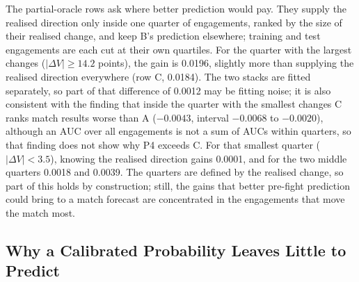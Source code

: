 The partial-oracle rows ask where better prediction would pay. They supply the realised direction only
inside one quarter of engagements, ranked by the size of their realised change, and keep B's prediction
elsewhere; training and test engagements are each cut at their own quartiles. For the quarter with the
largest changes ($|\Delta V| \geq 14.2$ points), the gain is 0.0196, slightly more than supplying the
realised direction everywhere (row C, 0.0184). The two stacks are fitted separately, so part of that
difference of 0.0012 may be fitting noise; it is also consistent with the finding that inside the quarter
with the smallest changes C ranks match results worse than A ($-0.0043$, interval $-0.0068$ to
$-0.0020$), although an AUC over all engagements is not a sum of AUCs within quarters, so that finding
does not show why P4 exceeds C. For that smallest quarter ($|\Delta V| < 3.5$), knowing the realised
direction gains 0.0001, and for the two middle quarters 0.0018 and 0.0039. The quarters are defined by
the realised change, so part of this holds by construction; still, the gains that better pre-fight prediction could
bring to a match forecast are concentrated in the engagements that move the match most.

\subsection{Why a Calibrated Probability Leaves Little to Predict}\label{sec:limit-martingale}

